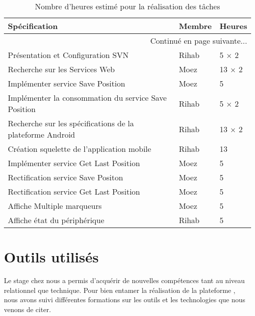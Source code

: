 \begin{center}
    \begin{longtable}{| l | l | l |}
        \caption{Nombre d'heures estimé pour la réalisation des tâches}
\label{tab:sprint1-estimation} \\

        \hline
        \textbf{Spécification} & \textbf{Membre} & \textbf{Heures} \\ \hline
        \endhead

        \hline \multicolumn{3}{|r|}{{Continué en page suivante$\dotsc$}} \\ \hline
        \endfoot

        \hline \hline
        \endlastfoot

        \hline
Présentation et Configuration SVN & Rihab & 5 $\times$ 2 \\ \hline
Recherche sur les Services Web & Moez & 13 $\times$ 2 \\ \hline
Implémenter service Save Position & Moez & 5 \\ \hline
Implémenter la consommation du service Save Position & Rihab & 5 $\times$ 2 \\ \hline
Recherche sur les spécifications de la plateforme Android & Rihab & 13 $\times$ 2 \\ \hline
Création squelette de l'application mobile & Rihab & 13 \\ \hline
Implémenter service Get Last Position & Moez & 5 \\ \hline
Rectification service Save Positon & Moez & 5 \\ \hline
Rectification service Get Last Position & Moez & 5 \\ \hline
Affiche Multiple marqueurs & Moez & 5 \\ \hline
Affiche état du périphérique & Rihab & 5 \\ \hline
    \end{longtable}
\end{center}

\section{Outils utilisés}

Le stage chez  nous a permis d'acquérir de nouvelles
compétences tant au niveau relationnel que technique. Pour bien entamer la
réalisation de la plateforme , nous avons suivi
différentes formations sur les outils et les technologies que nous venons de
citer.

